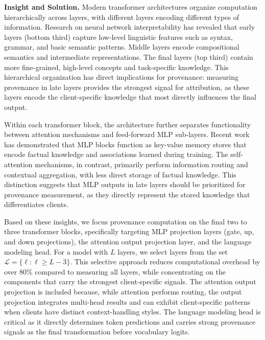 \textbf{Insight and Solution.} Modern transformer architectures organize computation hierarchically across layers, with different layers encoding different types of information. Research on neural network interpretability has revealed that early layers (bottom third) capture low-level linguistic features such as syntax, grammar, and basic semantic patterns. Middle layers encode compositional semantics and intermediate representations. The final layers (top third) contain more fine-grained, high-level concepts and task-specific knowledge. This hierarchical organization has direct implications for provenance: measuring provenance in late layers provides the strongest signal for attribution, as these layers encode the client-specific knowledge that most directly influences the final output.

Within each transformer block, the architecture further separates functionality between attention mechanisms and feed-forward MLP sub-layers. Recent work has demonstrated that MLP blocks function as key-value memory stores that encode factual knowledge and associations learned during training. The self-attention mechanisms, in contrast, primarily perform information routing and contextual aggregation, with less direct storage of factual knowledge. This distinction suggests that MLP outputs in late layers should be prioritized for provenance measurement, as they directly represent the stored knowledge that differentiates clients.

Based on these insights, we focus provenance computation on the final two to three transformer blocks, specifically targeting MLP projection layers (gate, up, and down projections), the attention output projection layer, and the language modeling head. For a model with $L$ layers, we select layers from the set $\mathcal{L} = \{\ell : \ell \geq L - 3\}$. This selective approach reduces computational overhead by over 80\% compared to measuring all layers, while concentrating on the components that carry the strongest client-specific signals. The attention output projection is included because, while attention performs routing, the output projection integrates multi-head results and can exhibit client-specific patterns when clients have distinct context-handling styles. The language modeling head is critical as it directly determines token predictions and carries strong provenance signals as the final transformation before vocabulary logits.

